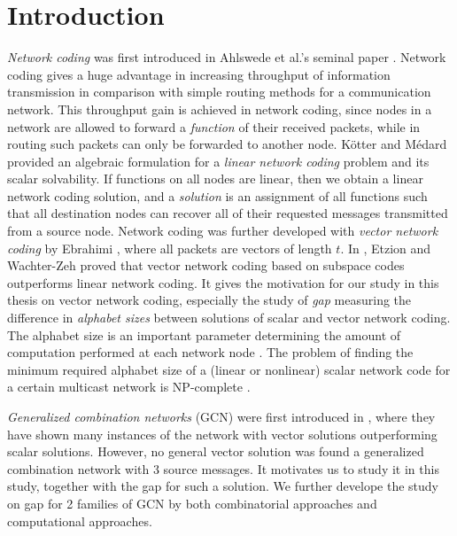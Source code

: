 \chapter{Introduction} \label{chap:introduction}

\textit{Network coding} was first introduced in Ahlswede et al.'s
seminal paper \cite{Ahlswede:2000}. Network coding gives a huge advantage
in increasing throughput of information transmission in comparison
with simple routing methods for a communication network. This throughput
gain is achieved in network coding, since nodes in a network are allowed
to forward a \textit{function} of their received packets, while in
routing such packets can only be forwarded to another node. K\"otter
and M\'edard provided an algebraic formulation for a \textit{linear
network coding} problem and its scalar solvability. If functions on
all nodes are linear, then we obtain a linear network coding solution,
and a \textit{solution} is an assignment of all functions such that
all destination nodes can recover all of their requested messages
transmitted from a source node. Network coding was further developed
with \textit{vector network coding} by Ebrahimi \cite{Ebrahimi:2011},
where all packets are vectors of length $t$. In \cite{Wachter-Zeh:2018},
Etzion and Wachter-Zeh proved that vector network coding based on
subspace codes outperforms linear network coding. It gives the motivation
for our study in this thesis on vector network coding, especially
the study of \textit{gap} measuring the difference in \textit{alphabet
sizes} between solutions of scalar and vector network coding. The
alphabet size is an important parameter determining the amount of
computation performed at each network node \cite{Wachter-Zeh:2018}.
The problem of finding the minimum required alphabet size of a (linear
or nonlinear) scalar network code for a certain multicast network
is NP-complete \cite{Langberg:2009,Lehman:2004,Gone:2018}. 

\textit{Generalized combination networks} (GCN) were first introduced
in \cite{Wachter-Zeh:2018}, where they have shown many instances
of the network with vector solutions outperforming scalar solutions.
However, no general vector solution was found a generalized combination
network with 3 source messages. It motivates us to study it in this
study, together with the gap for such a solution. We further develope
the study on gap for 2 families of GCN by both combinatorial approaches
and computational approaches. 

